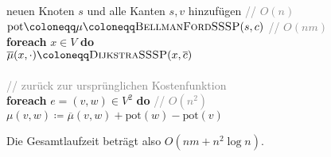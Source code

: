 \begin{pseudocode}
  neuen Knoten \( s \) und alle Kanten \( s,v \) hinzufügen \enskip{} \textcolor{gray}{// \( O(n) \)} \\
  \( \text{pot} \coloneqq \mu \coloneqq \textsc{BellmanFordSSSP}(s,c) \) \enskip{} \textcolor{gray}{// \( O(nm) \)} \\
  \textbf{foreach} \( x \in V \) \textbf{do} \\
  \phantom{\enskip} \( \overline{\mu}(x,\cdot) \coloneqq \textsc{DijkstraSSSP}(x,\overline{c}) \) \\
  \ \\
  \textcolor{gray}{// zurück zur ursprünglichen Kostenfunktion} \\
  \textbf{foreach} \( e = (v,w) \in V^2 \) \textbf{do} \enskip \textcolor{gray}{// \( O(n^2) \)} \\
  \phantom{\enskip} \( \mu(v,w) \coloneqq \overline{\mu}(v,w) + \text{pot}(w) - \text{pot}(v) \)
\end{pseudocode}

Die Gesamtlaufzeit beträgt also \( O(nm + n^2\log n) \).